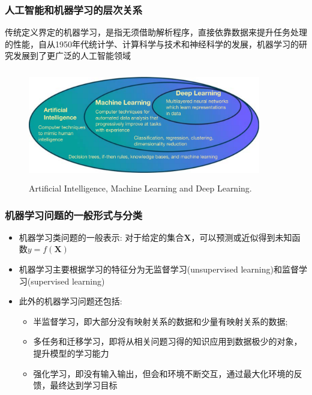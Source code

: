 \frame
{
	\frametitle{人工智能和机器学习的层次关系}
	传统定义界定的机器学习，是指无须借助解析程序，直接依靠数据来提升任务处理的性能，自从\textrm{1950}年代统计学、计算科学与技术和神经科学的发展，机器学习的研究发展到了更广泛的人工智能领域%
\begin{figure}[h!]
\centering
\vspace*{-0.1in}
\includegraphics[height=1.9in,width=4.0in,viewport=0 0 1275 550,clip]{Figures/Hierarchical_description_AI_ML_DL.png}
\caption{\tiny{\textrm{Artificial Intelligence, Machine Learning and Deep Learning.}}}%
\label{AI-ML}
\end{figure}
}

\frame
{
	\frametitle{机器学习问题的一般形式与分类}
	\begin{itemize}
		\item 机器学习类问题的一般表示:
\vskip 5pt
对于给定的集合$\mathbf{X}$，可以预测或近似得到未知函数$y=f(\mathbf{X})$
\vskip 4pt
{\fontsize{6.2pt}{4.2pt}}
\vskip 5pt
	\textcolor{blue}{\fontsize{8.0pt}{4.2pt}}
\item 机器学习主要根据学习的特征分为无监督学习\textrm{(unsupervised learning)}和监督学习\textrm{(supervised learning)}
	\item 此外的机器学习问题还包括:~
\begin{itemize}
	\item 半监督学习，即大部分没有映射关系的数据和少量有映射关系的数据;
	\item 多任务和迁移学习，即将从相关问题习得的知识应用到数据极少的对象，提升模型的学习能力
	\item 强化学习，即没有输入输出，但会和环境不断交互，通过最大化环境的反馈，最终达到学习目标
\end{itemize}
	\end{itemize}
}

